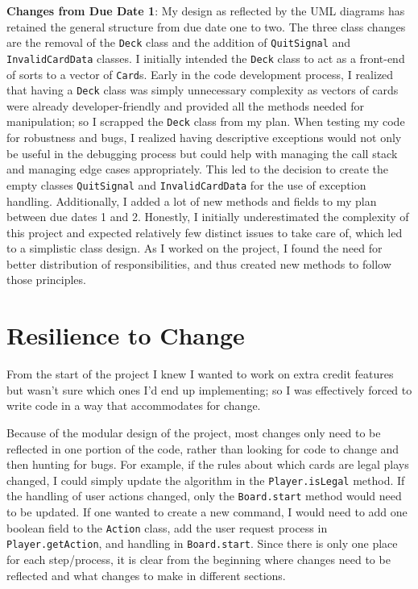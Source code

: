 \documentclass[12pt]{article}
\begin{document}
		{\bf Changes from Due Date 1}: My design as reflected by the UML diagrams has retained the general structure from due date one to two. The three class changes are the removal of the \texttt{Deck} class and the addition of \texttt{QuitSignal} and \texttt{InvalidCardData} classes. I initially intended the \texttt{Deck} class to act as a front-end of sorts to a vector of \texttt{Card}s. Early in the code development process, I realized that having a \texttt{Deck} class was simply unnecessary complexity as vectors of cards were already developer-friendly and provided all the methods needed for manipulation; so I scrapped the \texttt{Deck} class from my plan. When testing my code for robustness and bugs, I realized having descriptive exceptions would not only be useful in the debugging process but could help with managing the call stack and managing edge cases appropriately. This led to the decision to create the empty classes \texttt{QuitSignal} and \texttt{InvalidCardData} for the use of exception handling. Additionally, I added a lot of new methods and fields to my plan between due dates 1 and 2. Honestly, I initially underestimated the complexity of this project and expected relatively few distinct issues to take care of, which led to a simplistic class design. As I worked on the project, I found the need for better distribution of responsibilities, and thus created new methods to follow those principles.
	\section{Resilience to Change}
		From the start of the project I knew I wanted to work on extra credit features but wasn't sure which ones I'd end up implementing; so I was effectively forced to write code in a way that accommodates for change.

		Because of the modular design of the project, most changes only need to be reflected in one portion of the code, rather than looking for code to change and then hunting for bugs. For example, if the rules about which cards are legal plays changed, I could simply update the algorithm in the \texttt{Player.isLegal} method. If the handling of user actions changed, only the \texttt{Board.start} method would need to be updated. If one wanted to create a new command, I would need to add one boolean field to the \texttt{Action} class, add the user request process in \texttt{Player.getAction}, and handling in \texttt{Board.start}. Since there is only one place for each step/process, it is clear from the beginning where changes need to be reflected and what changes to make in different sections.
\end{document}

